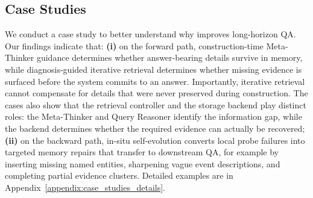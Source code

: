 \subsection{Case Studies}
\label{ssec:case_studies}
We conduct a case study to better understand why \method improves long-horizon QA.
Our findings indicate that:
\textbf{(i)} on the forward path, construction-time Meta-Thinker guidance determines whether answer-bearing details survive in memory, while diagnosis-guided iterative retrieval determines whether missing evidence is surfaced before the system commits to an answer.
Importantly, iterative retrieval cannot compensate for details that were never preserved during construction.
The cases also show that the retrieval controller and the storage backend play distinct roles: the Meta-Thinker and Query Reasoner identify the information gap, while the backend determines whether the required evidence can actually be recovered;
\textbf{(ii)} on the backward path, in-situ self-evolution converts local probe failures into targeted memory repairs that transfer to downstream QA, for example by inserting missing named entities, sharpening vague event descriptions, and completing partial evidence clusters.
Detailed examples are in Appendix~\ref{appendix:case_studies_details}.